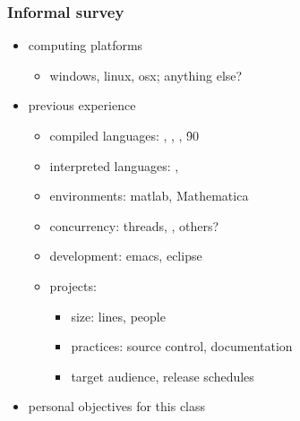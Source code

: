 \begin{frame}[fragile]
%
  \frametitle{Informal survey}
%
  \begin{itemize}
%
  \item computing platforms
    \begin{itemize}
      \item windows, linux, osx; anything else?
    \end{itemize}
%
  \item previous experience
    \begin{itemize}
      \item compiled languages: \cc, \cpp, \fortran, \f90
      \item interpreted languages: \python, \perl
      \item environments: matlab, Mathematica
      \item concurrency: threads, \mpi, others?
      \item development: emacs, eclipse
      \item projects:
        \begin{itemize}
        \item size: lines, people
        \item practices: source control, documentation
        \item target audience, release schedules
        \end{itemize}
    \end{itemize}
%
  \item personal objectives for this class
%
  \end{itemize}
%
\end{frame}

